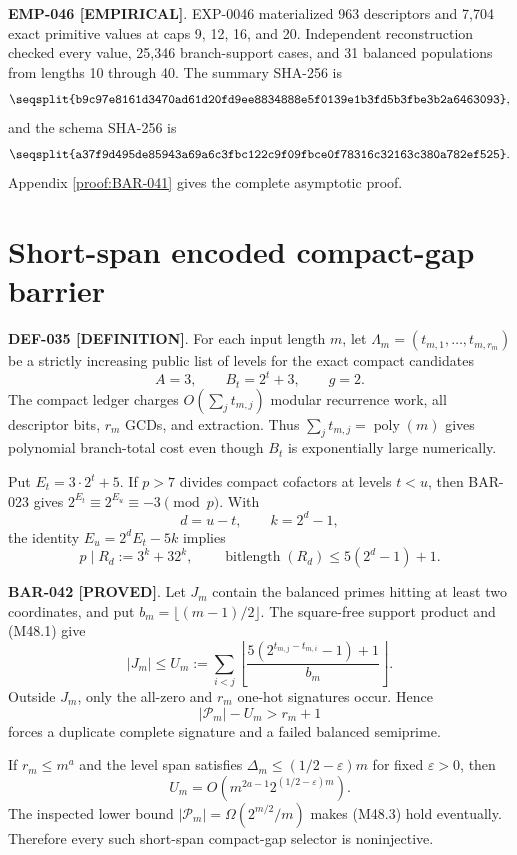 \documentclass[11pt]{article}
\newcommand{\claimstatus}[2]{\textbf{#1 [#2]}}
\begin{document}
\claimstatus{EMP-046}{EMPIRICAL}. EXP-0046 materialized 963 descriptors and
7,704 exact primitive values at caps 9, 12, 16, and 20. Independent
reconstruction checked every value, 25,346 branch-support cases, and 31
balanced populations from lengths 10 through 40. The summary SHA-256 is
\[
\texttt{\seqsplit{b9c97e8161d3470ad61d20fd9ee8834888e5f0139e1b3fd5b3fbe3b2a6463093}},
\]
and the schema SHA-256 is
\[
\texttt{\seqsplit{a37f9d495de85943a69a6c3fbc122c9f09fbce0f78316c32163c380a782ef525}}.
\]
Appendix \ref{proof:BAR-041} gives the complete asymptotic proof.

\section{Short-span encoded compact-gap barrier}

\claimstatus{DEF-035}{DEFINITION}. For each input length \(m\), let
\(\Lambda_m=(t_{m,1},\ldots,t_{m,r_m})\) be a strictly increasing public
list of levels for the exact compact candidates
\[
A=3,\qquad B_t=2^t+3,\qquad g=2.
\]
The compact ledger charges \(O(\sum_jt_{m,j})\) modular recurrence work,
all descriptor bits, \(r_m\) GCDs, and extraction. Thus
\(\sum_jt_{m,j}=\operatorname{poly}(m)\) gives polynomial branch-total cost
even though \(B_t\) is exponentially large numerically.

Put \(E_t=3\cdot2^t+5\). If \(p>7\) divides compact cofactors at levels
\(t<u\), then BAR-023 gives
\(2^{E_t}\equiv2^{E_u}\equiv-3\pmod p\). With
\[
d=u-t,\qquad k=2^d-1,
\]
the identity \(E_u=2^dE_t-5k\) implies
\[
p\mid R_d:=3^k+32^k,\qquad
\operatorname{bitlength}(R_d)\le5(2^d-1)+1.
\tag{M48.1}
\]

\claimstatus{BAR-042}{PROVED}. Let \(J_m\) contain the balanced primes
hitting at least two coordinates, and put
\(b_m=\lfloor(m-1)/2\rfloor\). The square-free support product and
(M48.1) give
\[
|J_m|\le U_m:=
\sum_{i<j}
\left\lfloor
\frac{5(2^{t_{m,j}-t_{m,i}}-1)+1}{b_m}
\right\rfloor.
\tag{M48.2}
\]
Outside \(J_m\), only the all-zero and \(r_m\) one-hot signatures occur.
Hence
\[
|\mathcal P_m|-U_m>r_m+1
\tag{M48.3}
\]
forces a duplicate complete signature and a failed balanced semiprime.

If \(r_m\le m^a\) and the level span satisfies
\(\Delta_m\le(1/2-\varepsilon)m\) for fixed
\(\varepsilon>0\), then
\[
U_m=O\!\left(m^{2a-1}2^{(1/2-\varepsilon)m}\right).
\]
The inspected lower bound
\(|\mathcal P_m|=\Omega(2^{m/2}/m)\) makes (M48.3) hold eventually.
Therefore every such short-span compact-gap selector is noninjective.
\end{document}
